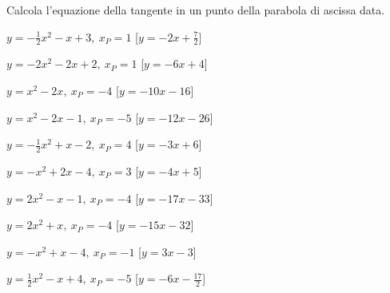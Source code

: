 \begin{esercizio}\label{ese:}
 Calcola l'equazione della tangente in un punto della parabola di ascissa data.
 \begin{enumeratea}
  \item  $y=-\frac{1}{2} x^2 - x +3,~x_P=1$
   \hfill [$y = -2 x +\frac{7}{2}$]
  \item  $y=-2 x^2 -2 x +2,~x_P=1$
   \hfill [$y = -6 x +4$]
  \item  $y=x^2 -2 x ,~x_P=-4$
   \hfill [$y = -10 x -16$]
  \item  $y=x^2 -2 x -1,~x_P=-5$
   \hfill [$y = -12 x -26$]
  \item  $y=-\frac{1}{2} x^2 + x -2,~x_P=4$
   \hfill [$y = -3 x +6$]
  \item  $y=- x^2 +2 x -4,~x_P=3$
   \hfill [$y = -4 x +5$]
  \item  $y=2 x^2 - x -1,~x_P=-4$
   \hfill [$y = -17 x -33$]
  \item  $y=2 x^2 + x ,~x_P=-4$
   \hfill [$y = -15 x -32$]
  \item  $y=- x^2 + x -4,~x_P=-1$
   \hfill [$y = 3 x -3$]
  \item  $y=\frac{1}{2} x^2 - x +4,~x_P=-5$
   \hfill [$y = -6 x -\frac{17}{2}$]
 \end{enumeratea}
\end{esercizio}

